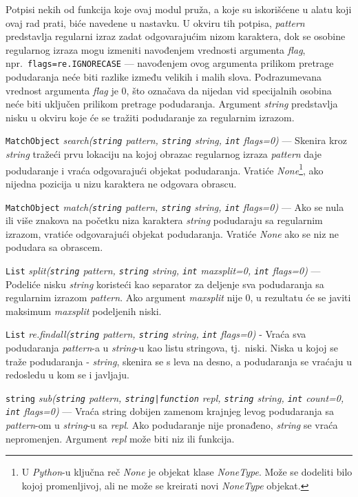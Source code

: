 \documentclass[12pt,oneside]{memoir}
\theoremstyle{plain}
\theoremstyle{definition}
\begin{document}

Potpisi nekih od funkcija koje ovaj modul pruža, a koje su iskorišćene u alatu koji ovaj rad prati, biće navedene u nastavku. U okviru tih potpisa, \textit{pattern} predstavlja regularni izraz zadat odgovarajućim nizom karaktera, dok se osobine regularnog izraza mogu izmeniti navođenjem vrednosti argumenta \textit{flag}, npr.~\texttt{flags=re.IGNORECASE} --- navođenjem ovog argumenta prilikom pretrage podudaranja neće biti razlike između velikih i malih slova. Podrazumevana vrednost argumenta \textit{flag} je 0, što označava da nijedan vid specijalnih osobina neće biti uključen prilikom pretrage podudaranja. Argument \textit{string} predstavlja nisku u okviru koje će se tražiti podudaranje za regularnim izrazom.


\begin{description}
\item  \texttt{MatchObject} \textit{search(\texttt{string} pattern, \texttt{string} string, \texttt{int} flags=0)} --- Skenira kroz \textit{string} tražeći prvu lokaciju na kojoj obrazac regularnog izraza \textit{pattern} daje podudaranje i vraća odgovarajući objekat podudaranja. Vratiće \textit{None}\footnote{U \textit{Python}-u ključna reč \textit{None} je objekat klase \textit{NoneType}. Može se dodeliti bilo kojoj promenljivoj, ali ne može se kreirati novi \textit{NoneType} objekat.}, ako nijedna pozicija u nizu karaktera ne odgovara obrascu. 
\item  \texttt{MatchObject} \textit{match(\texttt{string} pattern, \texttt{string} string, \texttt{int} flags=0)} --- Ako se nula ili više znakova na početku niza karaktera \textit{string} podudaraju sa regularnim izrazom, vratiće odgovarajući objekat podudaranja. Vratiće \textit{None} ako se niz ne podudara sa obrascem.
\item  \texttt{List} \textit{split(\texttt{string} pattern, \texttt{string} string, \texttt{int} maxsplit=0, \texttt{int} flags=0)} --- Podeliće nisku \textit{string} koristeći kao separator za deljenje sva podudaranja sa regularnim izrazom \textit{pattern}. Ako argument \textit{maxsplit} nije 0, u rezultatu će se javiti maksimum \textit{maxsplit} podeljenih niski.  
\item  \texttt{List} \textit{re.findall(\texttt{string} pattern, \texttt{string} string, \texttt{int} flags=0)} - Vraća sva podudaranja \textit{pattern}-a u \textit{string}-u kao listu stringova, tj.~niski. Niska u kojoj se traže podudaranja - \textit{string}, skenira se s leva na desno, a podudaranja se vraćaju u redosledu u kom se i javljaju. 
\item  \texttt{string} \textit{sub(\texttt{string} pattern, \texttt{string|function} repl, \texttt{string} string, \texttt{int} count=0, \texttt{int} flags=0)} --- Vraća string dobijen zamenom krajnjeg levog podudaranja sa \textit{pattern}-om u \textit{string}-u sa \textit{repl}. Ako podudaranje nije pronađeno, \textit{string} se vraća nepromenjen. Argument \textit{repl} može biti niz ili funkcija.
\end{description}
\end{document}
